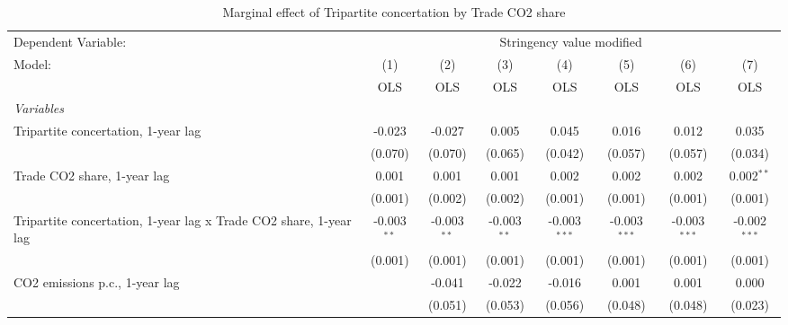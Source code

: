 
\begin{table}[htbp]
   \caption{Marginal effect of Tripartite concertation by Trade CO2 share}
   \centering
   \begin{tabular}{lccccccc}
      \toprule
      Dependent Variable: & \multicolumn{7}{c}{Stringency value modified}\\
      Model:                                                            & (1)           & (2)           & (3)           & (4)            & (5)            & (6)            & (7)\\  
                                                                        &  OLS          & OLS           & OLS           & OLS            & OLS            & OLS            & OLS\\  
      \midrule
      \emph{Variables}\\
      Tripartite concertation, 1-year lag                               & -0.023        & -0.027        & 0.005         & 0.045          & 0.016          & 0.012          & 0.035\\   
                                                                        & (0.070)       & (0.070)       & (0.065)       & (0.042)        & (0.057)        & (0.057)        & (0.034)\\   
      Trade CO2 share, 1-year lag                                       & 0.001         & 0.001         & 0.001         & 0.002          & 0.002          & 0.002          & 0.002$^{**}$\\   
                                                                        & (0.001)       & (0.002)       & (0.002)       & (0.001)        & (0.001)        & (0.001)        & (0.001)\\   
      Tripartite concertation, 1-year lag x Trade CO2 share, 1-year lag & -0.003$^{**}$ & -0.003$^{**}$ & -0.003$^{**}$ & -0.003$^{***}$ & -0.003$^{***}$ & -0.003$^{***}$ & -0.002$^{***}$\\   
                                                                        & (0.001)       & (0.001)       & (0.001)       & (0.001)        & (0.001)        & (0.001)        & (0.001)\\   
      CO2 emissions p.c., 1-year lag                                    &               & -0.041        & -0.022        & -0.016         & 0.001          & 0.001          & 0.000\\   
                                                                        &               & (0.051)       & (0.053)       & (0.056)        & (0.048)        & (0.048)        & (0.023)\\   

\end{tabular}
\end{table}
